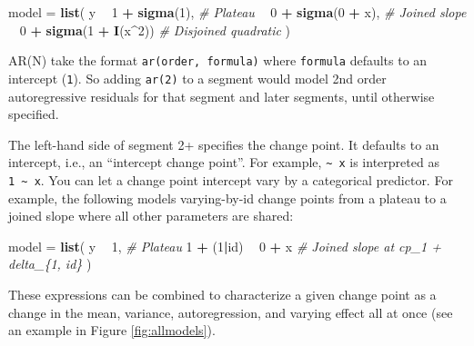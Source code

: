 \documentclass[
  american,
]{article}
\newenvironment{Shaded}{\begin{snugshade}}{\end{snugshade}}
\newcommand{\CommentTok}[1]{\textcolor[rgb]{0.56,0.35,0.01}{\textit{#1}}}
\newcommand{\DecValTok}[1]{\textcolor[rgb]{0.00,0.00,0.81}{#1}}
\newcommand{\KeywordTok}[1]{\textcolor[rgb]{0.13,0.29,0.53}{\textbf{#1}}}
\newcommand{\NormalTok}[1]{#1}
\newcommand{\OperatorTok}[1]{\textcolor[rgb]{0.81,0.36,0.00}{\textbf{#1}}}
\newcommand{\StringTok}[1]{\textcolor[rgb]{0.31,0.60,0.02}{#1}}
\begin{document}
\begin{Shaded}
\begin{Highlighting}[]
\NormalTok{model =}\StringTok{ }\KeywordTok{list}\NormalTok{(}
\NormalTok{  y }\OperatorTok{~}\StringTok{ }\DecValTok{1} \OperatorTok{+}\StringTok{ }\KeywordTok{sigma}\NormalTok{(}\DecValTok{1}\NormalTok{),       }\CommentTok{# Plateau}
    \OperatorTok{~}\StringTok{ }\DecValTok{0} \OperatorTok{+}\StringTok{ }\KeywordTok{sigma}\NormalTok{(}\DecValTok{0} \OperatorTok{+}\StringTok{ }\NormalTok{x),     }\CommentTok{# Joined slope}
    \OperatorTok{~}\StringTok{ }\DecValTok{0} \OperatorTok{+}\StringTok{ }\KeywordTok{sigma}\NormalTok{(}\DecValTok{1} \OperatorTok{+}\StringTok{ }\KeywordTok{I}\NormalTok{(x}\OperatorTok{^}\DecValTok{2}\NormalTok{)) }\CommentTok{# Disjoined quadratic}
\NormalTok{)}
\end{Highlighting}
\end{Shaded}

AR(N) take the format \texttt{ar(order,\ formula)} where \texttt{formula} defaults to an intercept (\texttt{1}). So adding \texttt{ar(2)} to a segment would model 2nd order autoregressive residuals for that segment and later segments, until otherwise specified.

The left-hand side of segment 2+ specifies the change point. It defaults to an intercept, i.e., an ``intercept change point''. For example, \texttt{\textasciitilde{}\ x} is interpreted as \texttt{1\ \textasciitilde{}\ x}. You can let a change point intercept vary by a categorical predictor. For example, the following models varying-by-id change points from a plateau to a joined slope where all other parameters are shared:

\begin{Shaded}
\begin{Highlighting}[]
\NormalTok{model =}\StringTok{ }\KeywordTok{list}\NormalTok{(}
\NormalTok{  y }\OperatorTok{~}\StringTok{ }\DecValTok{1}\NormalTok{,              }\CommentTok{# Plateau}
  \DecValTok{1} \OperatorTok{+}\StringTok{ }\NormalTok{(}\DecValTok{1}\OperatorTok{|}\NormalTok{id) }\OperatorTok{~}\StringTok{ }\DecValTok{0} \OperatorTok{+}\StringTok{ }\NormalTok{x  }\CommentTok{# Joined slope at cp_1 + delta_\{1, id\}}
\NormalTok{)}
\end{Highlighting}
\end{Shaded}

These expressions can be combined to characterize a given change point as a change in the mean, variance, autoregression, and varying effect all at once (see an example in Figure \ref{fig:allmodels}).
\end{document}
